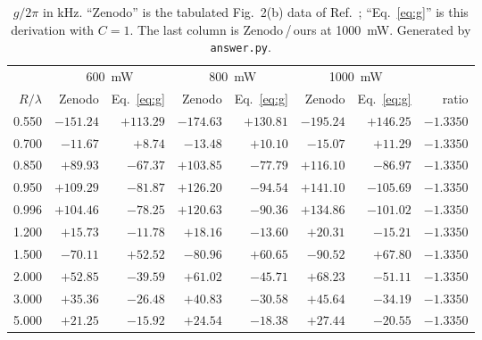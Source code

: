 \documentclass[11pt,a4paper]{article}
\begin{document}
\begin{table}[h]
\centering
\small
\begin{tabular}{r rr rr rr r}
\toprule
& \multicolumn{2}{c}{600~mW} & \multicolumn{2}{c}{800~mW}
& \multicolumn{2}{c}{1000~mW} & \\
\cmidrule(lr){2-3}\cmidrule(lr){4-5}\cmidrule(lr){6-7}
$R/\lambda$ & Zenodo & Eq.~\eqref{eq:g} & Zenodo & Eq.~\eqref{eq:g}
            & Zenodo & Eq.~\eqref{eq:g} & ratio \\
\midrule
0.550 & $-151.24$ & $+113.29$ & $-174.63$ & $+130.81$ & $-195.24$ & $+146.25$ & $-1.3350$ \\
0.700 & $-11.67$ & $+8.74$ & $-13.48$ & $+10.10$ & $-15.07$ & $+11.29$ & $-1.3350$ \\
0.850 & $+89.93$ & $-67.37$ & $+103.85$ & $-77.79$ & $+116.10$ & $-86.97$ & $-1.3350$ \\
0.950 & $+109.29$ & $-81.87$ & $+126.20$ & $-94.54$ & $+141.10$ & $-105.69$ & $-1.3350$ \\
0.996 & $+104.46$ & $-78.25$ & $+120.63$ & $-90.36$ & $+134.86$ & $-101.02$ & $-1.3350$ \\
1.200 & $+15.73$ & $-11.78$ & $+18.16$ & $-13.60$ & $+20.31$ & $-15.21$ & $-1.3350$ \\
1.500 & $-70.11$ & $+52.52$ & $-80.96$ & $+60.65$ & $-90.52$ & $+67.80$ & $-1.3350$ \\
2.000 & $+52.85$ & $-39.59$ & $+61.02$ & $-45.71$ & $+68.23$ & $-51.11$ & $-1.3350$ \\
3.000 & $+35.36$ & $-26.48$ & $+40.83$ & $-30.58$ & $+45.64$ & $-34.19$ & $-1.3350$ \\
5.000 & $+21.25$ & $-15.92$ & $+24.54$ & $-18.38$ & $+27.44$ & $-20.55$ & $-1.3350$ \\
\bottomrule
\end{tabular}
\caption{$g/2\pi$ in kHz.  ``Zenodo'' is the tabulated Fig.~2(b) data of
Ref.~\cite{Zenodo}; ``Eq.~\eqref{eq:g}'' is this derivation with $C=1$.  The last
column is Zenodo\,/\,ours at 1000~mW.  Generated by \texttt{answer.py}.}
\label{tab:crosscheck}
\end{table}
\end{document}
